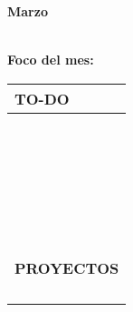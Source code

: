 {\raggedleft
	\fontsize{25}{50}\selectfont
	\textbf{Marzo}\\
}



	\textbf{\\Foco del mes:} \dotfill
	\renewcommand{\arraystretch}{1.5}\scriptsize
		\begin{longtabu} to \textwidth { X[l]}
		\centering \small{\textbf{TO-DO}} \\
		\toprule
		\makebox{$\square$} \dotfill\\
		\makebox{$\square$} \dotfill\\
		\makebox{$\square$} \dotfill\\
		\makebox{$\square$} \dotfill\\
		\makebox{$\square$} \dotfill\\
		\makebox{$\square$} \dotfill\\
		\makebox{$\square$} \dotfill\\
		\makebox{$\square$} \dotfill\\
		\makebox{$\square$} \dotfill\\
		\makebox{$\square$} \dotfill\\
		\makebox{$\square$} \dotfill\\
		\makebox{$\square$} \dotfill\\
		\makebox{$\square$} \dotfill\\
		\makebox{$\square$} \dotfill\\
		\makebox{$\square$} \dotfill\\
		\makebox{$\square$} \dotfill\\
		\makebox{$\square$} \dotfill\\
		\makebox{$\square$} \dotfill\\
		\makebox{$\square$} \dotfill\\
		\makebox{$\square$} \dotfill\\
		\makebox{$\square$} \dotfill\\
		\makebox{$\square$} \dotfill\\
		\makebox{$\square$} \dotfill\\
		\makebox{$\square$} \dotfill\\
		\makebox{$\square$} \dotfill\\

		\bottomrule

		\\
		\small{\textbf{PROYECTOS}} \\
		\makebox{$\square$} \dotfill\\
		\makebox{$\square$} \dotfill\\
		\makebox{$\square$} \dotfill\\
		\makebox{$\square$} \dotfill\\
	\end{longtabu}


